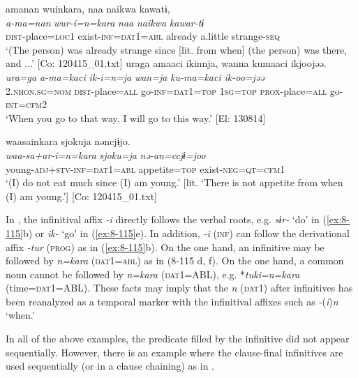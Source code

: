 {\TM}
\glll  amanan  wuinkara,  naa  naikwa  kawatɨ,\\
\textit{a-ma=nan}  \textit{wur-i=n=kara}  \textit{naa}  \textit{naikwa}  \textit{kawar-tɨ}\\
\textsc{dist}-place=\textsc{loc}1  exist-\textsc{inf}=\textsc{dat1}=\textsc{abl}  already  a.little  strange-\textsc{seq}\\
\glt ‘(The person) was already strange since [lit. from when] (the person) was there, and ...’ [Co: 120415\_01.txt]
\ex
{\TM}
\glll  uraga  amaaci  ikinnja,      wanna  kumaaci  ikjoojəə.\\
\textit{ura=ga}  \textit{a-ma=kaci}  \textit{ik-i=n=ja}   \textit{wan=ja}  \textit{ku-ma=kaci}  \textit{ik-oo=jəə}\\
2.\textsc{nhon}.\textsc{sg}=\textsc{nom}  \textsc{dist}-place=\textsc{all}  go-\textsc{inf}=\textsc{dat1}=\textsc{top}  1\textsc{sg}=\textsc{top}  \textsc{prox}-place=\textsc{all}  go-\textsc{int}=\textsc{cfm2}\\
\glt ‘When you go to that way, I will go to this way.’ [El: 130814]

\ex
{\TM}
\glll  waasainkara  {\textbar}sjoku{\textbar}ja  nəncjɨjo.\\
\textit{waa-sa+ar-i=n=kara}  \textit{sjoku=ja}  \textit{nə-an=ccjɨ=joo}\\
young-\textsc{adj}+\textsc{stv}-\textsc{inf}=\textsc{dat1}=\textsc{abl}  appetite=\textsc{top}  exist-\textsc{neg}=\textsc{qt}=\textsc{cfm1}\\
\glt ‘(I) do not eat much since (I) am young.’ [lit. ‘There is not appetite from when (I) am young.’]      [Co: 120415\_01.txt]
\z
\z


In , the infinitival affix \textit{-i} directly follows the verbal roots, e.g. \textit{sɨr-} ‘do’ in (\ref{ex:8-115}b) or \textit{ik-} ‘go’ in (\ref{ex:8-115}e). In addition, \textit{-i} (\textsc{inf}) can follow the derivational affix \textit{-tur} (\textsc{prog}) as in (\ref{ex:8-115}b). On the one hand, an infinitive may be followed by \textit{n=kara} (\textsc{dat1}=\textsc{abl}) as in (8-115 d, f). On the one hand, a common noun cannot be followed by \textit{n=kara} (\textsc{dat1}=ABL), e.g. *\textit{tuki=n=kara} (time=\textsc{dat1}=ABL). These facts may imply that the \textit{n} (\textsc{dat1}) after infinitives has been reanalyzed as a temporal marker with the infinitival affixes such as \textit{-}(\textit{i})\textit{n} ‘when.’

In all of the above examples, the predicate filled by the infinitive did not appear sequentially. However, there is an example where the clause-final infinitives are used sequentially (or in a clause chaining) as in .

